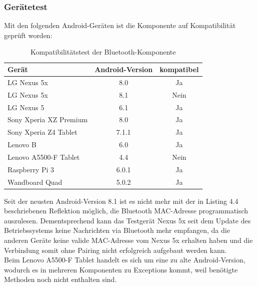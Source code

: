 \subsubsection{Gerätetest}
Mit den folgenden Android-Geräten ist die Komponente auf Kompatibilität geprüft worden:
\begin{table}[H]
	\begin{center}
		\caption{Kompatibilitätstest der Bluetooth-Komponente}
		\label{tab:dimensions}
		\begin{tabular}{l|c|c} 			
			Gerät & Android-Version & kompatibel \\
			\hline
			LG Nexus 5x & 8.0 & Ja\\
			LG Nexus 5x & 8.1 & Nein\\
			LG Nexus 5 & 6.1 & Ja\\
			Sony Xperia XZ Premium & 8.0 & Ja\\
			Sony Xperia Z4 Tablet & 7.1.1 & Ja\\
			Lenovo B & 6.0 & Ja\\
			Lenovo A5500-F Tablet & 4.4 & Nein\\
			Raspberry Pi 3 & 6.0.1 & Ja\\	
			Wandboard Quad & 5.0.2 & Ja\\			
		\end{tabular}
	\end{center}
\end{table}
Seit der neusten Android-Version 8.1 ist es nicht mehr mit der in Listing 4.4 beschriebenen Reflektion möglich, die Bluetooth MAC-Adresse programmatisch auszulesen. Dementsprechend kann das Testgerät Nexus 5x seit dem Update des Betriebssystems keine Nachrichten via Bluetooth mehr empfangen, da die anderen Geräte keine valide MAC-Adresse vom Nexus 5x erhalten haben und die Verbindung somit ohne Pairing nicht erfolgreich aufgebaut werden kann. 
\\Beim Lenovo A5500-F Tablet handelt es sich um eine zu alte Android-Version, wodurch es in mehreren Komponenten zu Exceptions kommt, weil benötigte Methoden noch nicht enthalten sind.



